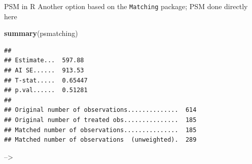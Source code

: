 \documentclass[
  ignorenonframetext,
  aspectratio=169, handout]{beamer}
\newenvironment{Shaded}{\begin{snugshade}}{\end{snugshade}}
\newcommand{\FunctionTok}[1]{\textcolor[rgb]{0.13,0.29,0.53}{\textbf{#1}}}
\newcommand{\NormalTok}[1]{#1}
\begin{document}
\begin{frame}[fragile]{PSM in R}
\protect\hypertarget{psm-in-r-7}{}
Another option based on the \texttt{Matching} package; PSM done directly
here \footnotesize

\begin{Shaded}
\begin{Highlighting}[]
\FunctionTok{summary}\NormalTok{(psmatching)}
\end{Highlighting}
\end{Shaded}

\begin{verbatim}
## 
## Estimate...  597.88 
## AI SE......  913.53 
## T-stat.....  0.65447 
## p.val......  0.51281 
## 
## Original number of observations..............  614 
## Original number of treated obs...............  185 
## Matched number of observations...............  185 
## Matched number of observations  (unweighted).  289
\end{verbatim}

--\textgreater{}
\end{frame}
\end{document}

